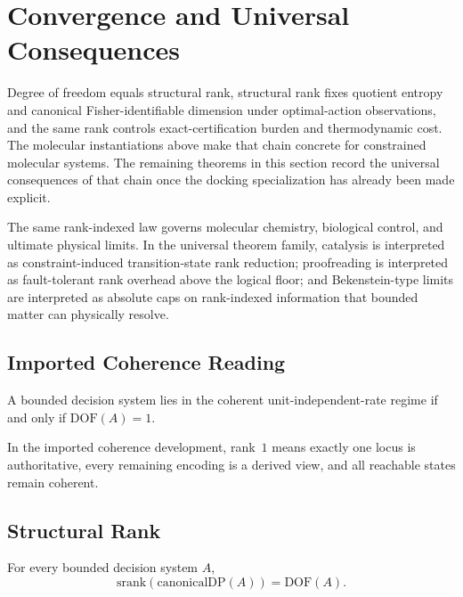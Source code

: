 \section{Convergence and Universal Consequences}\label{five-way-equivalence}

Degree of freedom equals structural rank, structural rank fixes quotient entropy and canonical Fisher-identifiable dimension under optimal-action observations, and the same rank controls exact-certification burden and thermodynamic cost. The molecular instantiations above make that chain concrete for constrained molecular systems. The remaining theorems in this section record the universal consequences of that chain once the docking specialization has already been made explicit.

The same rank-indexed law governs molecular chemistry, biological control, and ultimate physical limits. In the universal theorem family, catalysis is interpreted as constraint-induced transition-state rank reduction; proofreading is interpreted as fault-tolerant rank overhead above the logical floor; and Bekenstein-type limits are interpreted as absolute caps on rank-indexed information that bounded matter can physically resolve.

\subsection{Imported Coherence Reading}

\begin{theorem}\label{thm:coherent-single-source}
A bounded decision system lies in the coherent unit-independent-rate regime if and only if $\mathrm{DOF}(A)=1$.
\end{theorem}

\begin{remark}
In the imported coherence development, rank~$1$ means exactly one locus is authoritative, every remaining encoding is a derived view, and all reachable states remain coherent.
\end{remark}

\subsection{Structural Rank}

\begin{theorem}\label{thm:rank-identification}
For every bounded decision system $A$,
\[
\mathrm{srank}(\mathrm{canonicalDP}(A)) = \mathrm{DOF}(A).
\]
\end{theorem}

